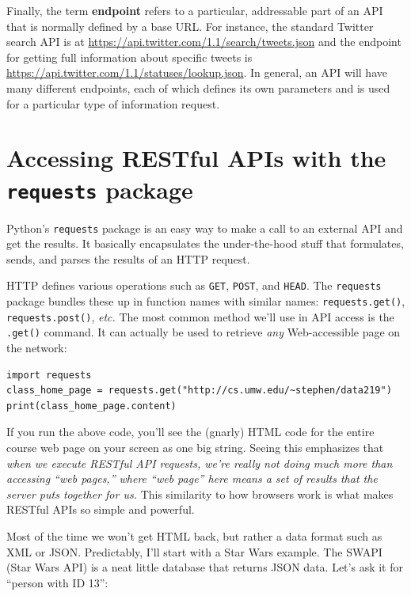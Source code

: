 \documentclass[12pt]{article}
\begin{document}
Finally, the term \textbf{endpoint} refers to a particular, addressable part
of an API that is normally defined by a base URL. For instance, the standard
Twitter search API is at \url{https://api.twitter.com/1.1/search/tweets.json}
and the endpoint for getting full information about specific tweets is \url{
https://api.twitter.com/1.1/statuses/lookup.json}. In general, an API will
have many different endpoints, each of which defines its own parameters and is
used for a particular type of information request.

\section{Accessing RESTful APIs with the \texttt{requests} package}

Python's \texttt{requests} package is an easy way to make a call to an
external API and get the results. It basically encapsulates the under-the-hood
stuff that formulates, sends, and parses the results of an HTTP request.

HTTP defines various operations such as \texttt{GET}, \texttt{POST}, and
\texttt{HEAD}. The \texttt{requests} package bundles these up in function
names with similar names: \texttt{requests.get()}, \texttt{requests.post()},
\textit{etc.} The most common method we'll use in API access is the
\texttt{.get()} command. It can actually be used to retrieve \textit{any}
Web-accessible page on the network:

\begin{Verbatim}[fontsize=\small,samepage=true,frame=none]
import requests
class_home_page = requests.get("http://cs.umw.edu/~stephen/data219")
print(class_home_page.content)
\end{Verbatim}

If you run the above code, you'll see the (gnarly) HTML code for the entire
course web page on your screen as one big string. Seeing this emphasizes that
\textit{when we execute RESTful API requests, we're really not doing much more
than accessing ``web pages,'' where ``web page'' here means a set of results
that the server puts together for us.} This similarity to how browsers work is
what makes RESTful APIs so simple and powerful.

Most of the time we won't get HTML back, but rather a data format such as XML
or JSON. Predictably, I'll start with a Star Wars example. The SWAPI (Star
Wars API) is a neat little database that returns JSON data. Let's ask it for
``person with ID 13'':
\end{document}
